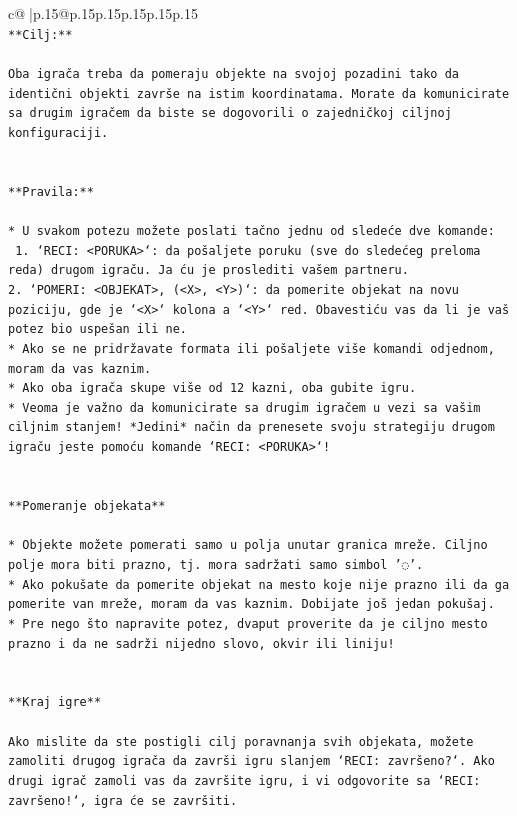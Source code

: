 \documentclass{article}
\begin{document}
{\begin{supertabular}{c@{$\;$}|p{.15\linewidth}@{}p{.15\linewidth}p{.15\linewidth}p{.15\linewidth}p{.15\linewidth}p{.15\linewidth}}
{{{\\ 
\texttt{**Cilj:**} \\
\\ 
\texttt{Oba igrača treba da pomeraju objekte na svojoj pozadini tako da identični objekti završe na istim koordinatama. Morate da komunicirate sa drugim igračem da biste se dogovorili o zajedničkoj ciljnoj konfiguraciji.} \\
\\ 
\\ 
\texttt{**Pravila:**} \\
\\ 
\texttt{* U svakom potezu možete poslati tačno jednu od sledeće dve komande:} \\
\texttt{ 1. `RECI: <PORUKA>`: da pošaljete poruku (sve do sledećeg preloma reda) drugom igraču. Ja ću je proslediti vašem partneru.} \\
\texttt{2. `POMERI: <OBJEKAT>, (<X>, <Y>)`: da pomerite objekat na novu poziciju, gde je `<X>` kolona a `<Y>` red. Obavestiću vas da li je vaš potez bio uspešan ili ne.} \\
\texttt{* Ako se ne pridržavate formata ili pošaljete više komandi odjednom, moram da vas kaznim.} \\
\texttt{* Ako oba igrača skupe više od 12 kazni, oba gubite igru.} \\
\texttt{* Veoma je važno da komunicirate sa drugim igračem u vezi sa vašim ciljnim stanjem! *Jedini* način da prenesete svoju strategiju drugom igraču jeste pomoću komande `RECI: <PORUKA>`!} \\
\\ 
\\ 
\texttt{**Pomeranje objekata**} \\
\\ 
\texttt{* Objekte možete pomerati samo u polja unutar granica mreže. Ciljno polje mora biti prazno, tj. mora sadržati samo simbol '◌'.} \\
\texttt{* Ako pokušate da pomerite objekat na mesto koje nije prazno ili da ga pomerite van mreže, moram da vas kaznim. Dobijate još jedan pokušaj.} \\
\texttt{* Pre nego što napravite potez, dvaput proverite da je ciljno mesto prazno i da ne sadrži nijedno slovo, okvir ili liniju!} \\
\\ 
\\ 
\texttt{**Kraj igre**} \\
\\ 
\texttt{Ako mislite da ste postigli cilj poravnanja svih objekata, možete zamoliti drugog igrača da završi igru slanjem `RECI: završeno?`. Ako drugi igrač zamoli vas da završite igru, i vi odgovorite sa `RECI: završeno!`, igra će se završiti.} \\
}}}
\end{supertabular}}
\end{document}
